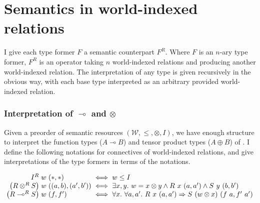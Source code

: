 \section{Semantics in world-indexed relations}

I give each type former $F$ a semantic counterpart $F^R$.
Where $F$ is an $n$-ary type former, $F^R$ is an operator taking $n$
world-indexed relations and producing another world-indexed relation.
The interpretation of any type is given recursively in the obvious way, with
each base type interpreted as an arbitrary provided world-indexed relation.

\subsubsection{Interpretation of $\multimap$ and $\otimes$}

Given a preorder of semantic resources
$(\mathcal{W}, \leq, \otimes, I)$, we have enough structure to
interpret the function types ($A \multimap B$) and tensor product types
($A \oplus B$) of \name{}.
I define the following notations for connectives of world-indexed relations,
and give interpretations of the type formers in terms of the notations.

\begin{displaymath}
  \arraycolsep=1.5pt
  \begin{array}{rllcl}
    I^R & w & (*,*) &\iff& w \leq I
    \\
    \plr{R \otimes^R S} & w & ((a,b),(a',b'))
    &\iff& \exists x,y.~w = x \otimes y
           \wedge R~x~(a,a')
           \wedge S~y~(b,b')
    \\
    \plr{R \multimap^R S} & w & (f,f')
    &\iff& \forall x.~\forall a,a'.~R~x~(a,a')
           \Rightarrow S~(w \otimes x)~(f~a,f'~a')
  \end{array}
\end{displaymath}



